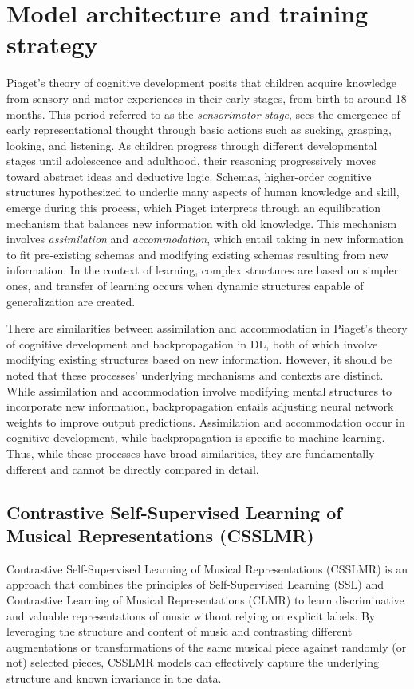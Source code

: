 \section{Model architecture and training strategy}
Piaget's theory of cognitive development \cite{Piagets_Theory_of_Cognitive_Development} posits that children acquire knowledge from sensory and motor experiences in their early stages, from birth to around 18 months. This period referred to as the \textit{sensorimotor stage}, sees the emergence of early representational thought through basic actions such as sucking, grasping, looking, and listening. As children progress through different developmental stages until adolescence and adulthood, their reasoning progressively moves toward abstract ideas and deductive logic. Schemas, higher-order cognitive structures hypothesized to underlie many aspects of human knowledge and skill, emerge during this process, which Piaget interprets through an equilibration mechanism that balances new information with old knowledge. This mechanism involves \textit{assimilation} and \textit{accommodation}, which entail taking in new information to fit pre-existing schemas and modifying existing schemas resulting from new information. In the context of learning, complex structures are based on simpler ones, and transfer of learning occurs when dynamic structures capable of generalization are created. \cite{audioselfsupsurvey}

There are similarities between assimilation and accommodation in Piaget's theory of cognitive development and backpropagation in DL, both of which involve modifying existing structures based on new information. However, it should be noted that these processes' underlying mechanisms and contexts are distinct. While assimilation and accommodation involve modifying mental structures to incorporate new information, backpropagation entails adjusting neural network weights to improve output predictions. Assimilation and accommodation occur in cognitive development, while backpropagation is specific to machine learning. Thus, while these processes have broad similarities, they are fundamentally different and cannot be directly compared in detail.

\subsection{Contrastive Self-Supervised Learning of Musical Representations (CSSLMR)}

Contrastive Self-Supervised Learning of Musical Representations (CSSLMR) is an approach that combines the principles of Self-Supervised Learning (SSL) and Contrastive Learning of Musical Representations (CLMR) to learn discriminative and valuable representations of music without relying on explicit labels. By leveraging the structure and content of music and contrasting different augmentations or transformations of the same musical piece against randomly (or not) selected pieces, CSSLMR models can effectively capture the underlying structure and known invariance in the data.


